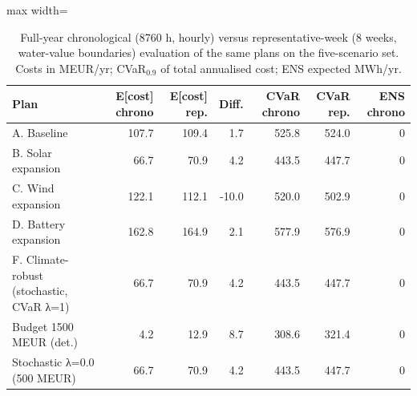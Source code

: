 \begin{table}[htbp]
\centering
\footnotesize
\caption{Full-year chronological (8760 h, hourly) versus representative-week (8 weeks, water-value boundaries) evaluation of the same plans on the five-scenario set. Costs in MEUR/yr; CVaR$_{0.9}$ of total annualised cost; ENS expected MWh/yr.}
\label{tab:chrono}
\begin{adjustbox}{max width=\linewidth}
\begin{tabular}{p{5cm}rrrrrr}
\toprule
Plan & E[cost] chrono & E[cost] rep. & Diff. & CVaR chrono & CVaR rep. & ENS chrono \\
\midrule
A. Baseline & 107.7 & 109.4 & 1.7 & 525.8 & 524.0 & 0 \\
B. Solar expansion & 66.7 & 70.9 & 4.2 & 443.5 & 447.7 & 0 \\
C. Wind expansion & 122.1 & 112.1 & -10.0 & 520.0 & 502.9 & 0 \\
D. Battery expansion & 162.8 & 164.9 & 2.1 & 577.9 & 576.9 & 0 \\
F. Climate-robust (stochastic, CVaR λ=1) & 66.7 & 70.9 & 4.2 & 443.5 & 447.7 & 0 \\
Budget 1500 MEUR (det.) & 4.2 & 12.9 & 8.7 & 308.6 & 321.4 & 0 \\
Stochastic λ=0.0 (500 MEUR) & 66.7 & 70.9 & 4.2 & 443.5 & 447.7 & 0 \\
\bottomrule
\end{tabular}
\end{adjustbox}
\end{table}

